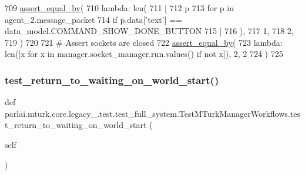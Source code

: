 \begin{DoxyCode}
709         \hyperlink{namespaceparlai_1_1mturk_1_1core_1_1test_1_1test__full__system_a0b463246d35658a2e422010f13dcf819}{assert\_equal\_by}(
710             \textcolor{keyword}{lambda}: len(
711                 [
712                     p
713                     \textcolor{keywordflow}{for} p \textcolor{keywordflow}{in} agent\_2.message\_packet
714                     \textcolor{keywordflow}{if} p.data[\textcolor{stringliteral}{'text'}] == data\_model.COMMAND\_SHOW\_DONE\_BUTTON
715                 ]
716             ),
717             1,
718             2,
719         )
720 
721         \textcolor{comment}{# Assert sockets are closed}
722         \hyperlink{namespaceparlai_1_1mturk_1_1core_1_1test_1_1test__full__system_a0b463246d35658a2e422010f13dcf819}{assert\_equal\_by}(
723             \textcolor{keyword}{lambda}: len([x \textcolor{keywordflow}{for} x \textcolor{keywordflow}{in} manager.socket\_manager.run.values() \textcolor{keywordflow}{if} \textcolor{keywordflow}{not} x]), 2, 2
724         )
725 
\end{DoxyCode}
\mbox{\label{classparlai_1_1mturk_1_1core_1_1legacy__2018_1_1test_1_1test__full__system_1_1TestMTurkManagerWorkflows_a8df04134623a7f640044c410742eab5f}} 
\subsubsection{\texorpdfstring{test\+\_\+return\+\_\+to\+\_\+waiting\+\_\+on\+\_\+world\+\_\+start()}{test\_return\_to\_waiting\_on\_world\_start()}}
{\footnotesize\ttfamily def parlai.\+mturk.\+core.\+legacy\+\_.\+test.\+test\+\_\+full\+\_\+system.\+Test\+M\+Turk\+Manager\+Workflows.\+test\+\_\+return\+\_\+to\+\_\+waiting\+\_\+on\+\_\+world\+\_\+start (\begin{DoxyParamCaption}\item[{}]{self }\end{DoxyParamCaption})}



